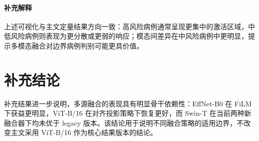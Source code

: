 \documentclass[12pt,a4paper]{ctexart}
\begin{document}
\paragraph{补充解释}
上述可视化与主文定量结果方向一致：高风险病例通常呈现更集中的激活区域，中低风险病例则表现为更分散或更弱的响应；模态间差异在中风险病例中更明显，提示多模态融合对边界病例判别可能更具价值。

\section{补充结论}
补充结果进一步说明，多源融合的表现具有明显骨干依赖性：EffNet-B0 在 FiLM 下获益更明显，ViT-B/16 在对齐投影策略下恢复更好，而 Swin-T 在当前两种新融合器下均未优于 legacy 版本。该结论用于说明不同融合策略的适用边界，不改变主文采用 ViT-B/16 作为核心结果版本的结论。
\end{document}
